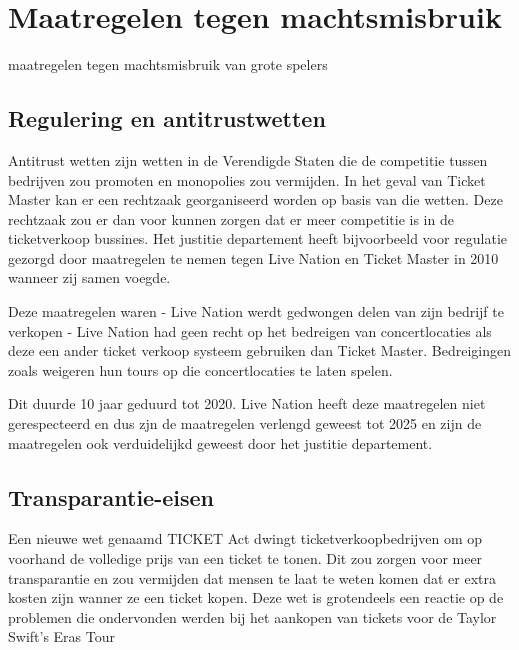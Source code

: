 
\section{Maatregelen tegen machtsmisbruik}

maatregelen tegen machtsmisbruik van grote spelers

\subsection{Regulering en antitrustwetten}

Antitrust wetten zijn wetten in de Verendigde Staten die de competitie tussen bedrijven zou promoten en monopolies
zou vermijden. In het geval van Ticket Master kan er een rechtzaak georganiseerd worden op basis van die wetten.
Deze rechtzaak zou er dan voor kunnen zorgen dat er meer competitie is in de ticketverkoop bussines. 
Het justitie departement heeft bijvoorbeeld voor regulatie gezorgd door maatregelen te nemen tegen 
Live Nation en Ticket Master in 2010 wanneer zij samen voegde.
 
Deze maatregelen waren
- Live Nation werdt gedwongen delen van zijn bedrijf te verkopen
- Live Nation had geen recht op het bedreigen van concertlocaties als deze een ander ticket verkoop systeem gebruiken dan 
  Ticket Master. Bedreigingen zoals weigeren hun tours op die concertlocaties te laten spelen.

Dit duurde 10 jaar geduurd tot 2020. Live Nation heeft deze maatregelen niet gerespecteerd en dus zjn de 
maatregelen verlengd geweest tot 2025 en zijn de maatregelen ook verduidelijkd geweest door het justitie departement.


\subsection{Transparantie-eisen}

Een nieuwe wet genaamd TICKET Act dwingt ticketverkoopbedrijven om op voorhand de volledige prijs van een ticket
te tonen. Dit zou zorgen voor meer transparantie en zou vermijden dat mensen te laat te weten komen dat er extra 
kosten zijn wanner ze een ticket kopen. Deze wet is grotendeels een reactie op de problemen die ondervonden werden
bij het aankopen van tickets voor de Taylor Swift's Eras Tour


